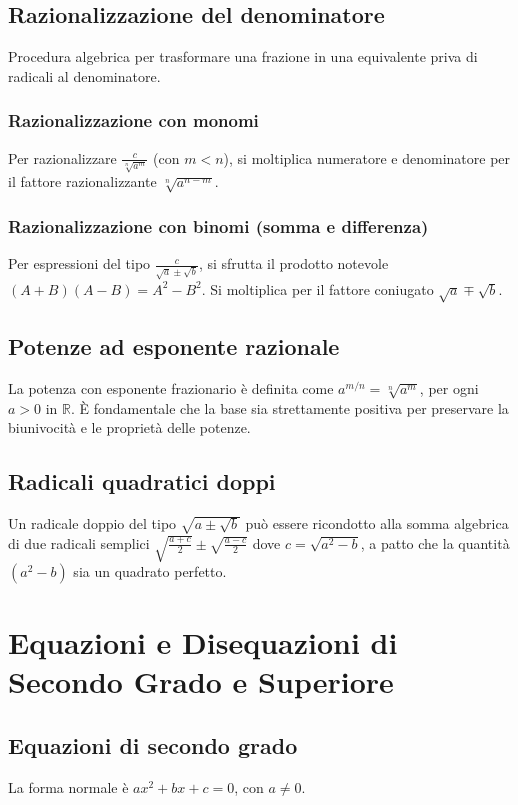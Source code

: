\subsection{Razionalizzazione del denominatore}
Procedura algebrica per trasformare una frazione in una equivalente priva di radicali al denominatore.
\subsubsection{Razionalizzazione con monomi}
Per razionalizzare $\frac{c}{\sqrt[n]{a^m}}$ (con $m < n$), si moltiplica numeratore e denominatore per il fattore razionalizzante $\sqrt[n]{a^{n-m}}$.

\subsubsection{Razionalizzazione con binomi (somma e differenza)}
Per espressioni del tipo $\frac{c}{\sqrt{a} \pm \sqrt{b}}$, si sfrutta il prodotto notevole $(A+B)(A-B) = A^2 - B^2$. Si moltiplica per il fattore coniugato $\sqrt{a} \mp \sqrt{b}$.

\subsection{Potenze ad esponente razionale}
La potenza con esponente frazionario è definita come $a^{m/n} = \sqrt[n]{a^m}$, per ogni $a > 0$ in $\mathbb{R}$. È fondamentale che la base sia strettamente positiva per preservare la biunivocità e le proprietà delle potenze.

\subsection{Radicali quadratici doppi}
Un radicale doppio del tipo $\sqrt{a \pm \sqrt{b}}$ può essere ricondotto alla somma algebrica di due radicali semplici $\sqrt{\frac{a + c}{2}} \pm \sqrt{\frac{a - c}{2}}$ dove $c = \sqrt{a^2 - b}$, a patto che la quantità $(a^2 - b)$ sia un quadrato perfetto.

\section{Equazioni e Disequazioni di Secondo Grado e Superiore}
\subsection{Equazioni di secondo grado}
La forma normale è $ax^2 + bx + c = 0$, con $a \neq 0$.

